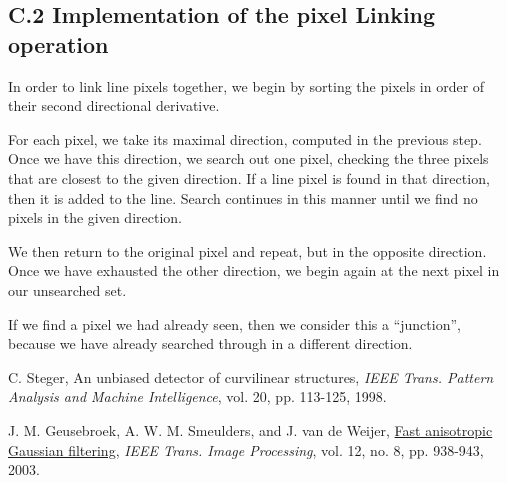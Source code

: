 \documentclass{article}
\begin{document}
\pagebreak
\subsection*{C.2 Implementation of the pixel Linking operation}

In order to link line pixels together, we begin by sorting the pixels in order of their second directional derivative.

For each pixel, we take its maximal direction, computed in the previous step. Once we have this direction, we search out one pixel, checking the three pixels that are closest to the given direction. If a line pixel is found in that direction, then it is added to the line. Search continues in this manner until we find no pixels in the given direction.

We then return to the original pixel and repeat, but in the opposite direction. Once we have exhausted the other direction, we begin again at the next pixel in our unsearched set.

If we find a pixel we had already seen, then we consider this a ``junction'', because we have already searched through in a different direction.


\pagebreak
\begin{thebibliography}{9}
\fontsize{10pt}{12pt}\selectfont
\raggedright

        C. Steger, An unbiased detector of curvilinear structures, 
        \emph{IEEE Trans. Pattern Analysis and Machine Intelligence},
        vol. 20, pp. 113-125, 1998.

        J. M. Geusebroek, A. W. M. Smeulders, and J. van de Weijer, 
        \ul{Fast anisotropic Gaussian filtering},
        \emph{IEEE Trans. Image Processing}, vol. 12, no. 8, pp. 938-943, 2003.


\end{thebibliography}


\end{document}
